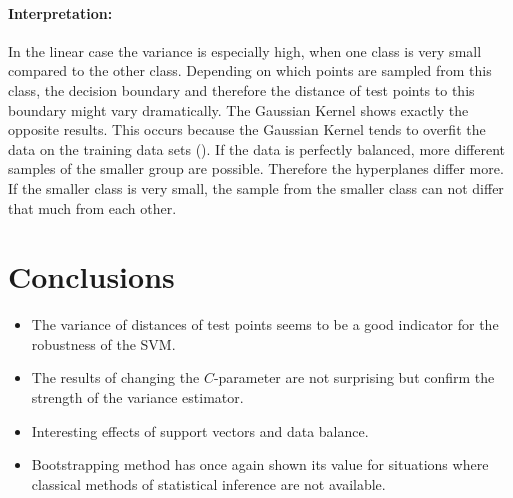 \documentclass[a1,portrait]{a0poster}
\begin{document}
\begin{multicols}{3}
\paragraph{Interpretation:}
In the linear case the variance is especially high, when one class is very small compared to the other class. Depending on which points are sampled from this class, the decision boundary and therefore the distance of test points to this boundary might vary dramatically.
The Gaussian Kernel shows exactly the opposite results. This occurs because the Gaussian Kernel tends to overfit the data on the training data sets (\cite{hastie_elements_2005}). If the data is perfectly balanced, more different samples of the smaller group are possible. Therefore the hyperplanes differ more. If the smaller class is very small, the sample from the smaller class can not differ that much from each other.




\color{hu_red} %

\section*{Conclusions}

\begin{itemize}
\item The variance of distances of test points seems to be a good indicator for the robustness of the SVM.
\item The results of changing the $C$-parameter are not surprising but confirm the strength of the variance estimator.
\item Interesting effects of support vectors and data balance.
\item Bootstrapping method has once again shown its value for situations where classical methods of statistical inference are not available.
\end{itemize}

\color{Black} %



\end{multicols}
\end{document}
